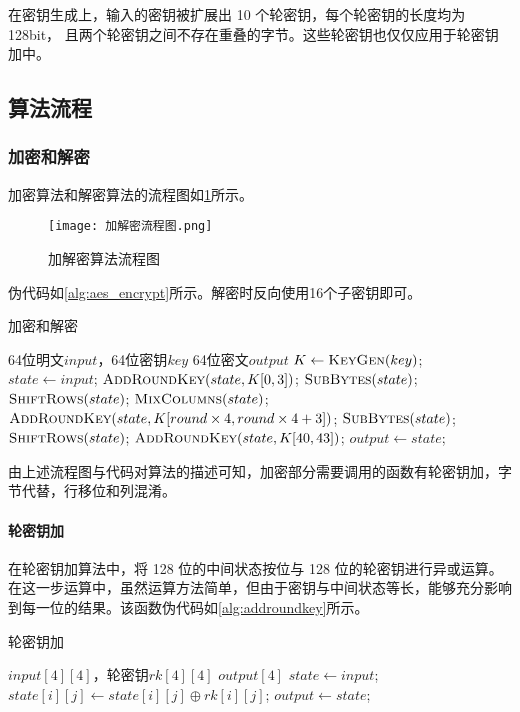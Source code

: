 \documentclass[a4paper, zihao=-4, UTF-8]{ctexart}
\begin{document}
	在密钥生成上，输入的密钥被扩展出 10 个轮密钥，每个轮密钥的长度均为 128bit，
	且两个轮密钥之间不存在重叠的字节。这些轮密钥也仅仅应用于轮密钥加中。
	\subsection{算法流程}
	\subsubsection{加密和解密}
	
	加密算法和解密算法的流程图如\cref{fig:crypt_flow_chart}所示。
	
	\begin{figure}[htbp]
		\centering
		\texttt{[image: 加解密流程图.png]}
		\caption{加解密算法流程图}
		\label{fig:crypt_flow_chart}
	\end{figure}
	
	伪代码如\cref{alg:aes_encrypt}所示。解密时反向使用16个子密钥即可。
	\begin{algorithm}[htbp]
		\caption{加密和解密}
		\label{alg:aes_encrypt}
		\begin{algorithmic}[1]
			\Require 64位明文$input$，64位密钥$key$
			\Ensure 64位密文$output$
			\State $K\gets \Call{KeyGen}{key}$;
			\State $state\gets input$;
			\State $\Call{AddRoundKey}{state, K[0,3]}$;
				\State $\Call{SubBytes}{state}$;
				\State $\Call{ShiftRows}{state}$;
				\State $\Call{MixColumns}{state}$;
				\State $\Call{AddRoundKey}{state, K[round \times 4, round \times 4 + 3]}$;
			\EndFor
			\State $\Call{SubBytes}{state}$;
			\State $\Call{ShiftRows}{state}$;
			\State $\Call{AddRoundKey}{state, K[40,43]}$;
			\State $output\gets state$;
			\State {}
			\EndFunction
		\end{algorithmic}
	\end{algorithm}
	\par 由上述流程图与代码对算法的描述可知，加密部分需要调用的函数有轮密钥加，字节代替，行移位和列混淆。
	\paragraph{轮密钥加} 在轮密钥加算法中，将 128 位的中间状态按位与 128 位的轮密钥进行异或运算。在这一步运算中，虽然运算方法简单，但由于密钥与中间状态等长，能够充分影响到每一位的结果。该函数伪代码如\cref{alg:addroundkey}所示。
	
	\begin{algorithm}[htbp]
		\caption{轮密钥加}
		\label{alg:addroundkey}
		\begin{algorithmic}[1]
			\Require $input[4][4]$，轮密钥$rk[4][4]$
			\Ensure $output[4]$
			\State $state \gets input$;
					\State $state[i][j] \gets state[i][j]\oplus rk[i][j]$;
				\EndFor
			\EndFor
			\State $output\gets state$;
			\State {}
			\EndFunction
		\end{algorithmic}
	\end{algorithm}
	
\end{document}

